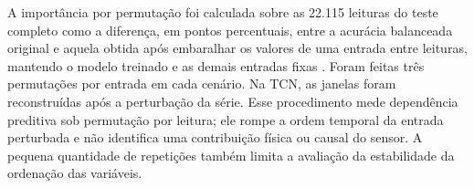 A importância por permutação foi calculada sobre as 22.115 leituras do
teste completo como a diferença, em pontos percentuais, entre a acurácia
balanceada original e aquela obtida após embaralhar os valores de uma
entrada entre leituras, mantendo o modelo treinado e as demais entradas
fixas \cite{fisher2019modelreliance}. Foram feitas três permutações por
entrada em cada cenário. Na TCN, as janelas foram reconstruídas após a
perturbação da série. Esse procedimento mede dependência preditiva sob
permutação por leitura; ele rompe a ordem temporal da entrada perturbada
e não identifica uma contribuição física ou causal do sensor. A pequena
quantidade de repetições também limita a avaliação da estabilidade da
ordenação das variáveis.
